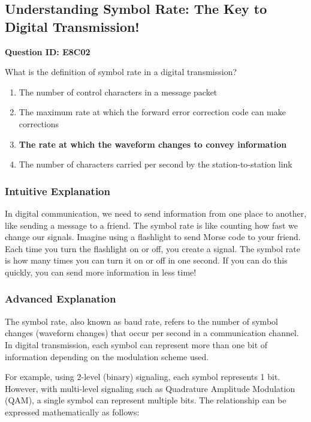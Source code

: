 \subsection{Understanding Symbol Rate: The Key to Digital Transmission!}

\begin{tcolorbox}[colframe=blue!50!black, colback=blue!10, coltitle=black]
\textbf{Question ID: E8C02} 

What is the definition of symbol rate in a digital transmission? 

\begin{enumerate}[label=\Alph*.]
    \item The number of control characters in a message packet
    \item The maximum rate at which the forward error correction code can make corrections
    \item \textbf{The rate at which the waveform changes to convey information}
    \item The number of characters carried per second by the station-to-station link
\end{enumerate}
\end{tcolorbox}

\subsubsection{Intuitive Explanation}
In digital communication, we need to send information from one place to another, like sending a message to a friend. The symbol rate is like counting how fast we change our signals. Imagine using a flashlight to send Morse code to your friend. Each time you turn the flashlight on or off, you create a signal. The symbol rate is how many times you can turn it on or off in one second. If you can do this quickly, you can send more information in less time!

\subsubsection{Advanced Explanation}
The symbol rate, also known as baud rate, refers to the number of symbol changes (waveform changes) that occur per second in a communication channel. In digital transmission, each symbol can represent more than one bit of information depending on the modulation scheme used. 

For example, using 2-level (binary) signaling, each symbol represents 1 bit. However, with multi-level signaling such as Quadrature Amplitude Modulation (QAM), a single symbol can represent multiple bits. The relationship can be expressed mathematically as follows:

